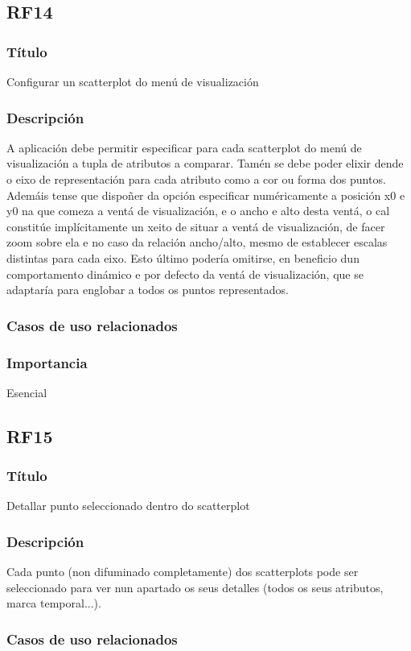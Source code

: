 \subsection*{RF14}
\subsubsection{Título}
Configurar un scatterplot do menú de visualización
\subsubsection{Descripción}
A aplicación debe permitir especificar para cada scatterplot do menú de visualización a tupla de atributos a comparar. Tamén se debe poder elixir dende o eixo de representación para cada atributo como a cor ou forma dos puntos. Ademáis tense que dispoñer da opción especificar numéricamente a posición x0 e y0 na que comeza a ventá de visualización, e o ancho e alto desta ventá, o cal constitúe implícitamente un xeito de situar a ventá de visualización, de facer zoom sobre ela e no caso da relación ancho/alto, mesmo de establecer escalas distintas para cada eixo. Esto último podería omitirse, en beneficio dun comportamento dinámico e por defecto da ventá de visualización, que se adaptaría para englobar a todos os puntos representados.
\subsubsection{Casos de uso relacionados}
\subsubsection{Importancia}
Esencial

\subsection*{RF15}
\subsubsection{Título}
Detallar punto seleccionado dentro do scatterplot
\subsubsection{Descripción}
Cada punto (non difuminado completamente) dos scatterplots pode ser seleccionado para ver nun apartado os seus detalles (todos os seus atributos, marca temporal...).
\subsubsection{Casos de uso relacionados}
